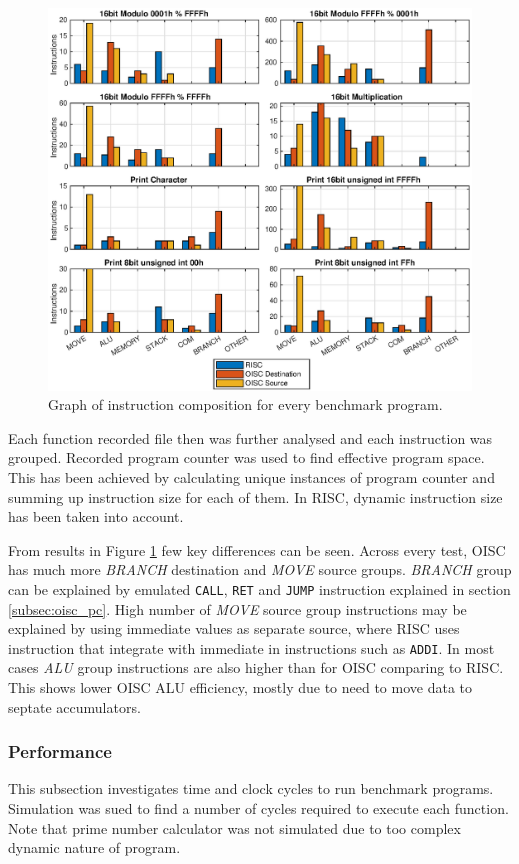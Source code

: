 \begin{figure}[t]
	\centering
	\includegraphics[width=\linewidth]{../tests/instr_comp.eps}
	\caption{Graph of instruction composition for every benchmark program.}
	\label{fig:instr_comp}
\end{figure}


Each function recorded file then was further analysed and each instruction was grouped. Recorded program counter was used to find effective program space. This has been achieved by calculating unique instances of program counter and summing up instruction size for each of them. In RISC, dynamic instruction size has been taken into account. 

From results in Figure \ref{fig:instr_comp} few key differences can be seen. Across every test, OISC has much more \textit{BRANCH} destination and \textit{MOVE} source groups. \textit{BRANCH} group can be explained by emulated \texttt{CALL}, \texttt{RET} and \texttt{JUMP} instruction explained in section \ref{subsec:oisc_pc}.
High number of \textit{MOVE} source group instructions may be explained by using immediate values as separate source, where RISC uses instruction that integrate with immediate in instructions such as \texttt{ADDI}. In most cases \textit{ALU} group instructions are also higher than for OISC comparing to RISC. This shows lower OISC ALU efficiency, mostly due to need to move data to septate accumulators.

\subsubsection{Performance}
This subsection investigates time and clock cycles to run benchmark programs. Simulation was sued to find a number of cycles required to execute each function. Note that prime number calculator was not simulated due to too complex dynamic nature of program. 

